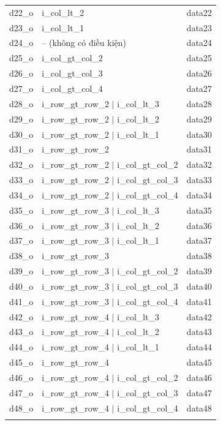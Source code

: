 \begin{longtable}{|p{3cm}|p{8cm}|p{4cm}|}
	d22\_o & i\_col\_lt\_2 & data22 \\
	d23\_o & i\_col\_lt\_1 & data23 \\
	d24\_o & -- (không có điều kiện) & data24 \\
	d25\_o & i\_col\_gt\_col\_2 & data25 \\
	d26\_o & i\_col\_gt\_col\_3 & data26 \\
	d27\_o & i\_col\_gt\_col\_4 & data27 \\
	d28\_o & i\_row\_gt\_row\_2 $\vert$ i\_col\_lt\_3 & data28 \\
	d29\_o & i\_row\_gt\_row\_2 $\vert$ i\_col\_lt\_2 & data29 \\
	d30\_o & i\_row\_gt\_row\_2 $\vert$ i\_col\_lt\_1 & data30 \\
	d31\_o & i\_row\_gt\_row\_2 & data31 \\
	d32\_o & i\_row\_gt\_row\_2 $\vert$ i\_col\_gt\_col\_2 & data32 \\
	d33\_o & i\_row\_gt\_row\_2 $\vert$ i\_col\_gt\_col\_3 & data33 \\
	d34\_o & i\_row\_gt\_row\_2 $\vert$ i\_col\_gt\_col\_4 & data34 \\
	d35\_o & i\_row\_gt\_row\_3 $\vert$ i\_col\_lt\_3 & data35 \\
	d36\_o & i\_row\_gt\_row\_3 $\vert$ i\_col\_lt\_2 & data36 \\
	d37\_o & i\_row\_gt\_row\_3 $\vert$ i\_col\_lt\_1 & data37 \\
	d38\_o & i\_row\_gt\_row\_3 & data38 \\
	d39\_o & i\_row\_gt\_row\_3 $\vert$ i\_col\_gt\_col\_2 & data39 \\
	d40\_o & i\_row\_gt\_row\_3 $\vert$ i\_col\_gt\_col\_3 & data40 \\
	d41\_o & i\_row\_gt\_row\_3 $\vert$ i\_col\_gt\_col\_4 & data41 \\
	d42\_o & i\_row\_gt\_row\_4 $\vert$ i\_col\_lt\_3 & data42 \\
	d43\_o & i\_row\_gt\_row\_4 $\vert$ i\_col\_lt\_2 & data43 \\
	d44\_o & i\_row\_gt\_row\_4 $\vert$ i\_col\_lt\_1 & data44 \\
	d45\_o & i\_row\_gt\_row\_4 & data45 \\
	d46\_o & i\_row\_gt\_row\_4 $\vert$ i\_col\_gt\_col\_2 & data46 \\
	d47\_o & i\_row\_gt\_row\_4 $\vert$ i\_col\_gt\_col\_3 & data47 \\
	d48\_o & i\_row\_gt\_row\_4 $\vert$ i\_col\_gt\_col\_4 & data48 \\
	\hline

		\label{tab:conditionForOutputZero7x7}
\end{longtable}


